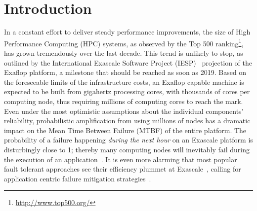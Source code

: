 \section{Introduction}
\label{sect:intro}

In a constant effort to deliver steady performance improvements, the size of
High Performance Computing (HPC) systems, as observed by the Top 500
ranking\footnote{\url{http://www.top500.org/}}, has grown tremendously over the
last decade. This trend is unlikely to stop, as outlined by the International
Exascale Software Project (IESP)~\cite{IESP} projection of the Exaflop platform,
a milestone that should be reached as soon as 2019. Based on the foreseeable
limits of the infrastructure costs, an Exaflop capable machine is expected to be
built from gigahertz processing cores, with thousands of cores per computing
node, thus requiring millions of computing cores to reach the mark. Even under
the most optimistic assumptions about the individual components' reliability,
probabilistic amplification from using millions of nodes has a dramatic impact
on the Mean Time Between Failure (MTBF) of the entire platform. The probability
of a failure happening \emph{during the next hour} on an Exascale platform is
disturbingly close to 1; thereby many computing nodes will inevitably fail
during the execution of an application~\cite{ExaScaleResilience09}.  It is even
more alarming that most popular fault tolerant approaches see their efficiency
plummet at Exascale~\cite{BOSILCA-2012-696154,lawn265}, calling for application
centric failure mitigation strategies~\cite{huang1984algorithm}.

